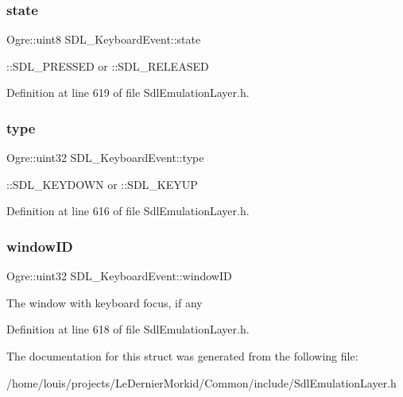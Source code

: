 \subsubsection{\texorpdfstring{state}{state}}
{\footnotesize\ttfamily Ogre\+::uint8 S\+D\+L\+\_\+\+Keyboard\+Event\+::state}

\+::\+S\+D\+L\+\_\+\+P\+R\+E\+S\+S\+ED or \+::\+S\+D\+L\+\_\+\+R\+E\+L\+E\+A\+S\+ED 

Definition at line 619 of file Sdl\+Emulation\+Layer.\+h.

\mbox{\label{struct_s_d_l___keyboard_event_a1a3eea65c5a9af99bc19f492cbe9ad60}} 
\subsubsection{\texorpdfstring{type}{type}}
{\footnotesize\ttfamily Ogre\+::uint32 S\+D\+L\+\_\+\+Keyboard\+Event\+::type}

\+::\+S\+D\+L\+\_\+\+K\+E\+Y\+D\+O\+WN or \+::\+S\+D\+L\+\_\+\+K\+E\+Y\+UP 

Definition at line 616 of file Sdl\+Emulation\+Layer.\+h.

\mbox{\label{struct_s_d_l___keyboard_event_a1f39f22a6dc08d06ddc21ceff061a289}} 
\subsubsection{\texorpdfstring{window\+ID}{windowID}}
{\footnotesize\ttfamily Ogre\+::uint32 S\+D\+L\+\_\+\+Keyboard\+Event\+::window\+ID}

The window with keyboard focus, if any 

Definition at line 618 of file Sdl\+Emulation\+Layer.\+h.



The documentation for this struct was generated from the following file\+:\begin{DoxyCompactItemize}
\item 
/home/louis/projects/\+Le\+Dernier\+Morkid/\+Common/include/Sdl\+Emulation\+Layer.\+h\end{DoxyCompactItemize}
